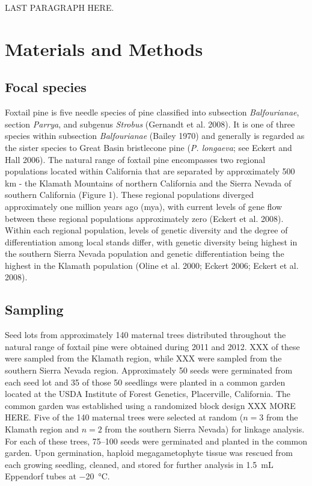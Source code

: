 \documentclass[11pt]{article}
\begin{document}
LAST PARAGRAPH HERE.


\section{Materials and Methods}

\subsection{Focal species}
Foxtail pine is five needle species of pine classified into 
subsection \textit{Balfourianae}, section \textit{Parrya}, and subgenus \textit{Strobus} 
(Gernandt et al. 2008). It is one of three species within subsection \textit{Balfourianae} 
(Bailey 1970) and generally is regarded as the sister species to Great Basin bristlecone pine (\textit{P. longaeva}; see 
Eckert and Hall 2006). The natural range of foxtail pine encompasses two 
regional populations located within California that are separated by approximately 500 km - 
the Klamath Mountains of northern California and the Sierra Nevada of southern California 
(Figure 1). These regional populations diverged approximately one million years ago (mya), 
with current levels of gene flow between these regional populations approximately zero 
(Eckert et al. 2008). Within each regional population, levels of genetic diversity and the 
degree of differentiation among local stands differ, with genetic diversity being highest in 
the southern Sierra Nevada population and genetic differentiation being the highest in the 
Klamath population (Oline et al. 2000; Eckert 2006; Eckert et al. 2008).

\subsection{Sampling}
Seed lots from approximately 140 maternal trees distributed throughout the natural range 
of foxtail pine were obtained during 2011 and 2012. XXX of these were sampled from the 
Klamath region, while XXX were sampled from the southern Sierra Nevada region. Approximately 
50 seeds were germinated from each seed lot and 35 of those 50 seedlings were planted in a 
common garden located at the USDA Institute of Forest Genetics, Placerville, California. The 
common garden was established using a randomized block design XXX MORE HERE. Five of the 
140 maternal trees were selected at random ($n = 3$ from the Klamath region and $n = 2$ from 
the southern Sierra Nevada) for linkage analysis. For each of these trees, \SIrange{75}{100}{} 
seeds were germinated and planted in the common garden. Upon germination, haploid 
megagametophyte tissue was rescued from each growing seedling, cleaned, and stored for further 
analysis in \SI{1.5}{\mL} Eppendorf tubes at \SI{-20}{\celsius}.
\end{document}

